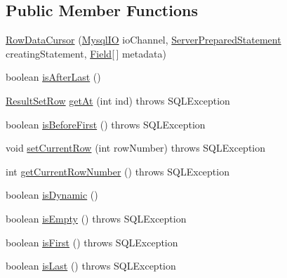\subsection*{Public Member Functions}
\begin{DoxyCompactItemize}
\item 
\mbox{\hyperlink{classcom_1_1mysql_1_1jdbc_1_1_row_data_cursor_a5c4df32b4bdf5e09cb54a21bfc22363b}{Row\+Data\+Cursor}} (\mbox{\hyperlink{classcom_1_1mysql_1_1jdbc_1_1_mysql_i_o}{Mysql\+IO}} io\+Channel, \mbox{\hyperlink{classcom_1_1mysql_1_1jdbc_1_1_server_prepared_statement}{Server\+Prepared\+Statement}} creating\+Statement, \mbox{\hyperlink{classcom_1_1mysql_1_1jdbc_1_1_field}{Field}}\mbox{[}$\,$\mbox{]} metadata)
\item 
boolean \mbox{\hyperlink{classcom_1_1mysql_1_1jdbc_1_1_row_data_cursor_a10bcae5f8f9281ca74dae8f107f8ebed}{is\+After\+Last}} ()
\item 
\mbox{\hyperlink{classcom_1_1mysql_1_1jdbc_1_1_result_set_row}{Result\+Set\+Row}} \mbox{\hyperlink{classcom_1_1mysql_1_1jdbc_1_1_row_data_cursor_a0027f3f5693ea4392c71528296e25e86}{get\+At}} (int ind)  throws S\+Q\+L\+Exception 
\item 
boolean \mbox{\hyperlink{classcom_1_1mysql_1_1jdbc_1_1_row_data_cursor_a1c63929717c789969a16960cc340bdad}{is\+Before\+First}} ()  throws S\+Q\+L\+Exception 
\item 
void \mbox{\hyperlink{classcom_1_1mysql_1_1jdbc_1_1_row_data_cursor_a530066237bc36be6444d4c8c0ae01be2}{set\+Current\+Row}} (int row\+Number)  throws S\+Q\+L\+Exception 
\item 
int \mbox{\hyperlink{classcom_1_1mysql_1_1jdbc_1_1_row_data_cursor_aaa74825dc4ae9b34d7b36e8aec089227}{get\+Current\+Row\+Number}} ()  throws S\+Q\+L\+Exception 
\item 
boolean \mbox{\hyperlink{classcom_1_1mysql_1_1jdbc_1_1_row_data_cursor_a181d924b1f4a28875db321305489f179}{is\+Dynamic}} ()
\item 
boolean \mbox{\hyperlink{classcom_1_1mysql_1_1jdbc_1_1_row_data_cursor_a80a9aff446cac640c3259b3c6f53b716}{is\+Empty}} ()  throws S\+Q\+L\+Exception 
\item 
boolean \mbox{\hyperlink{classcom_1_1mysql_1_1jdbc_1_1_row_data_cursor_a6df7eb0ab6cebd6c865d86bee9b43d7f}{is\+First}} ()  throws S\+Q\+L\+Exception 
\item 
boolean \mbox{\hyperlink{classcom_1_1mysql_1_1jdbc_1_1_row_data_cursor_a33786d1f3d481e4c69912d15a8953675}{is\+Last}} ()  throws S\+Q\+L\+Exception 
\item 

\end{DoxyCompactItemize}
